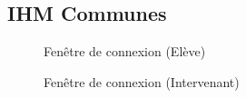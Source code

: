 \subsection{IHM Communes}
\begin{figure}[H]
    \centering %
    \begin{minipage}{0.49\textwidth} %
        \centering
        \caption{Fenêtre de connexion (Elève)}
    \end{minipage}\hfill %
    \begin{minipage}{0.49\textwidth} %
        \centering
        \caption{Fenêtre de connexion (Intervenant)}
    \end{minipage}
\end{figure}

